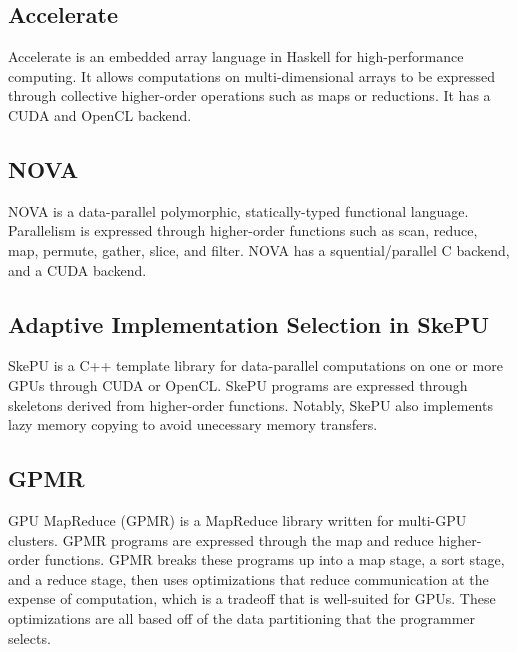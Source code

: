 \subsection*{Accelerate}
Accelerate\cite{accelerate} is an embedded array language in Haskell for 
high-performance
computing. It allows computations on multi-dimensional arrays to be expressed
through collective higher-order operations such as maps or reductions. It has
a CUDA and OpenCL backend.

\subsection*{NOVA}
NOVA\cite{collins2013nova} is a data-parallel polymorphic, statically-typed
functional language. Parallelism is expressed through higher-order functions
such as scan, reduce, map, permute, gather, slice, and filter. NOVA has a
squential/parallel C backend, and a CUDA backend.

\subsection*{Adaptive Implementation Selection in SkePU}
SkePU\cite{enmyren2010skepu} is a C++ template library for data-parallel
computations on one or more GPUs through CUDA or OpenCL. SkePU programs are
expressed through skeletons derived from higher-order functions. Notably,
SkePU also implements lazy memory copying to avoid unecessary memory transfers.

\subsection*{GPMR}
GPU MapReduce (GPMR)\cite{stuart2011multi} is a  MapReduce library written
for multi-GPU clusters. GPMR programs are expressed through the map and reduce
higher-order functions. GPMR breaks these programs up into a map stage, a sort stage, and a reduce stage, then uses optimizations that reduce communication at
the expense of computation, which is a tradeoff that is well-suited for GPUs.
These optimizations are all based off of the data partitioning that the
programmer selects.

